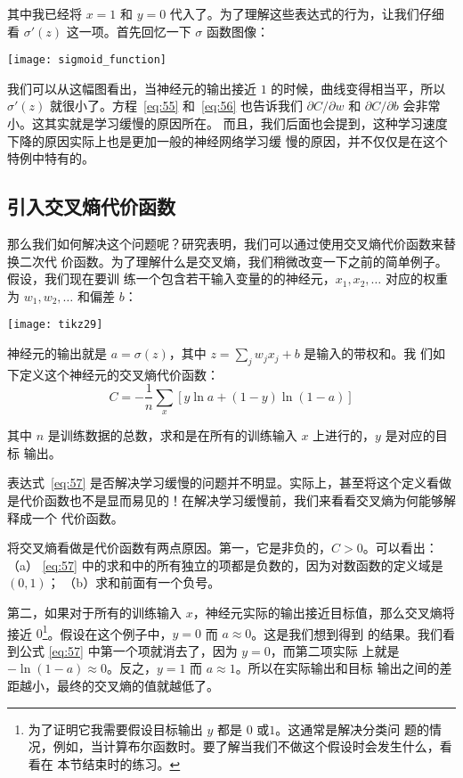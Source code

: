 其中我已经将 $x = 1$ 和 $y = 0$ 代入了。为了理解这些表达式的行为，让我们仔细看
$\sigma'(z)$ 这一项。首先回忆一下 $\sigma$ 函数图像：
\begin{center}
  \texttt{[image: sigmoid\_function]}
\end{center}

我们可以从这幅图看出，当神经元的输出接近 $1$ 的时候，曲线变得相当平，所以
$\sigma'(z)$ 就很小了。方程~\eqref{eq:55} 和~\eqref{eq:56} 也告诉我们 $\partial
C/\partial w$ 和 $\partial C/\partial b$ 会非常小。这其实就是学习缓慢的原因所在。
而且，我们后面也会提到，这种学习速度下降的原因实际上也是更加一般的神经网络学习缓
慢的原因，并不仅仅是在这个特例中特有的。

\subsection{引入交叉熵代价函数}
\label{sec:introducing_the_cross-entropy_cost_function}

那么我们如何解决这个问题呢？研究表明，我们可以通过使用交叉熵代价函数来替换二次代
价函数。为了理解什么是交叉熵，我们稍微改变一下之前的简单例子。假设，我们现在要训
练一个包含若干输入变量的的神经元，$x_1, x_2, \ldots$ 对应的权重为 $w_1, w_2,
\ldots$ 和偏差 $b$：

\begin{center}
  \texttt{[image: tikz29]}
\end{center}

神经元的输出就是 $a = \sigma(z)$，其中 $z = \sum_j w_j x_j+b$ 是输入的带权和。我
们如下定义这个神经元的交叉熵代价函数：
\begin{equation}
  C = -\frac{1}{n} \sum_x \left[y \ln a + (1-y ) \ln (1-a) \right]
\label{eq:57}\tag{57}
\end{equation}

其中 $n$ 是训练数据的总数，求和是在所有的训练输入 $x$ 上进行的，$y$ 是对应的目标
输出。

表达式~\eqref{eq:57} 是否解决学习缓慢的问题并不明显。实际上，甚至将这个定义看做
是代价函数也不是显而易见的！在解决学习缓慢前，我们来看看交叉熵为何能够解释成一个
代价函数。

将交叉熵看做是代价函数有两点原因。第一，它是非负的，$C > 0$。可以看出：（a）
\eqref{eq:57} 中的求和中的所有独立的项都是负数的，因为对数函数的定义域是 $(0,1)$；
      （b）求和前面有一个负号。

第二，如果对于所有的训练输入 $x$，神经元实际的输出接近目标值，那么交叉熵将接近
$0$\footnote{为了证明它我需要假设目标输出 $y$ 都是 $0$ 或$1$。这通常是解决分类问
  题的情况，例如，当计算布尔函数时。要了解当我们不做这个假设时会发生什么，看看在
  本节结束时的练习。}。假设在这个例子中，$y=0$ 而 $a\approx 0$。这是我们想到得到
的结果。我们看到公式 \eqref{eq:57} 中第一个项就消去了，因为 $y=0$，而第二项实际
上就是 $-\ln (1-a)\approx 0$。反之，$y=1$ 而 $a\approx 1$。所以在实际输出和目标
输出之间的差距越小，最终的交叉熵的值就越低了。

